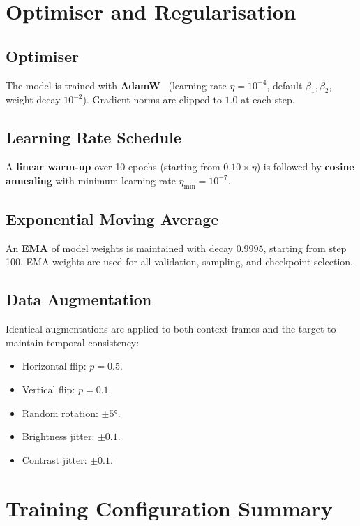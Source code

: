 \documentclass[12pt, a4paper, twoside]{report}
\begin{document}
\section{Optimiser and Regularisation}
\label{sec:optimiser}

\subsection{Optimiser}
\label{ssec:optimizer}

The model is trained with \textbf{AdamW}~\cite{loshchilov2019decoupled}
(learning rate $\eta = 10^{-4}$, default $\beta_1, \beta_2$, weight decay
$10^{-2}$).
Gradient norms are clipped to $1.0$ at each step.

\subsection{Learning Rate Schedule}
\label{ssec:lr_schedule}

A \textbf{linear warm-up} over 10 epochs (starting from $0.10 \times \eta$)
is followed by \textbf{cosine annealing} with minimum learning rate
$\eta_{\min} = 10^{-7}$.

\subsection{Exponential Moving Average}
\label{ssec:ema}

An \textbf{EMA} of model weights is maintained with decay $0.9995$,
starting from step 100.
EMA weights are used for all validation, sampling, and checkpoint selection.

\subsection{Data Augmentation}
\label{ssec:augmentation}

Identical augmentations are applied to both context frames and the target to
maintain temporal consistency:
\begin{itemize}
  \item Horizontal flip: $p = 0.5$.
  \item Vertical flip: $p = 0.1$.
  \item Random rotation: $\pm 5°$.
  \item Brightness jitter: $\pm 0.1$.
  \item Contrast jitter: $\pm 0.1$.
\end{itemize}

\section{Training Configuration Summary}
\label{sec:config_summary}
\end{document}

